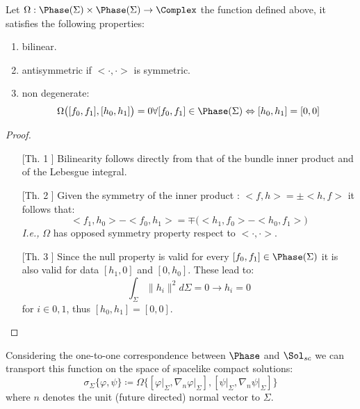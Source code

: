 \documentclass[Main]{subfiles}
\begin{document}
			\begin{proposition}
				Let  $\Omega: \Phase(\Sigma) \times \Phase(\Sigma) \rightarrow \Complex $ the function defined above, it satisfies the following properties:
				\begin{enumerate}
					\item bilinear.
					\item antisymmetric if $<\cdot, \cdot>$ is symmetric.
					\item non degenerate:
						\begin{displaymath}
							\Omega\big( [f_0,f_1], [h_0,h_1] \big) =0 \forall [f_0,f_1]\in \Phase(\Sigma) \Leftrightarrow [h_0,h_1] =[0,0]
						\end{displaymath}
				\end{enumerate}
			\end{proposition}
			\begin{proof}
				\forcenewline
				\begin{itemize}
					\item[[Th. 1]]
						Bilinearity follows directly from that of the bundle inner product and %
						of the Lebesgue integral.

					\item[[Th. 2]]
						Given the symmetry of the inner product : $ <f,h> = \pm <h,f>$ it  follows that:
						\begin{displaymath}
							<f_1,h_0> -<f_0,h_1> = \mp \big( <h_1,f_0> - <h_0,f_1> \big)
						\end{displaymath}
						\textit{I.e.,} $\Omega$ has opposed symmetry property respect to $<\cdot,\cdot>$.

					\item[[Th. 3]]
						Since the null property is valid for every $[f_0,f_1]\in \Phase(\Sigma)$ it is also valid for data $[h_1,0]$ and $[0,h_0]$.
						These lead to:%
						\begin{displaymath}
							\int_\Sigma \parallel h_i \parallel^2 d\Sigma = 0 \rightarrow h_i = 0
						\end{displaymath}
						for $i \in {0,1}$, thus $[h_0,h_1] = [0,0]$.
				\end{itemize}
			\end{proof}

			Considering the one-to-one correspondence between $\Phase$ and $\Sol_{sc}$ we can transport this function on the space of spacelike compact solutions:
			\begin{displaymath}
				\sigma_\Sigma \big\{ \varphi, \psi \big\} \coloneqq
				\Omega \big\{ [\varphi\vert_\Sigma, \nabla_n\varphi\vert_\Sigma] ,[\psi\vert_\Sigma,\nabla_n\psi\vert_\Sigma] \big\}
			\end{displaymath}
			where $n$ denotes the unit (future directed) normal vector to $\Sigma$.
\end{document}
